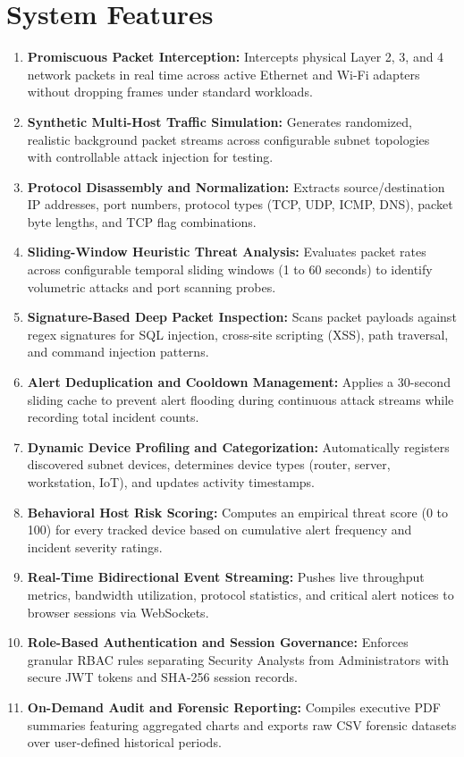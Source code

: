 \documentclass[a4paper,12pt]{report}
\begin{document}
	\section{System Features}
	\begin{enumerate}
		\item \textbf{Promiscuous Packet Interception:} Intercepts physical Layer 2, 3, and 4 network packets in real time across active Ethernet and Wi-Fi adapters without dropping frames under standard workloads.
		\item \textbf{Synthetic Multi-Host Traffic Simulation:} Generates randomized, realistic background packet streams across configurable subnet topologies with controllable attack injection for testing.
		\item \textbf{Protocol Disassembly and Normalization:} Extracts source/destination IP addresses, port numbers, protocol types (TCP, UDP, ICMP, DNS), packet byte lengths, and TCP flag combinations.
		\item \textbf{Sliding-Window Heuristic Threat Analysis:} Evaluates packet rates across configurable temporal sliding windows (1 to 60 seconds) to identify volumetric attacks and port scanning probes.
		\item \textbf{Signature-Based Deep Packet Inspection:} Scans packet payloads against regex signatures for SQL injection, cross-site scripting (XSS), path traversal, and command injection patterns.
		\item \textbf{Alert Deduplication and Cooldown Management:} Applies a 30-second sliding cache to prevent alert flooding during continuous attack streams while recording total incident counts.
		\item \textbf{Dynamic Device Profiling and Categorization:} Automatically registers discovered subnet devices, determines device types (router, server, workstation, IoT), and updates activity timestamps.
		\item \textbf{Behavioral Host Risk Scoring:} Computes an empirical threat score (0 to 100) for every tracked device based on cumulative alert frequency and incident severity ratings.
		\item \textbf{Real-Time Bidirectional Event Streaming:} Pushes live throughput metrics, bandwidth utilization, protocol statistics, and critical alert notices to browser sessions via WebSockets.
		\item \textbf{Role-Based Authentication and Session Governance:} Enforces granular RBAC rules separating Security Analysts from Administrators with secure JWT tokens and SHA-256 session records.
		\item \textbf{On-Demand Audit and Forensic Reporting:} Compiles executive PDF summaries featuring aggregated charts and exports raw CSV forensic datasets over user-defined historical periods.
	\end{enumerate}
	
\end{document}

